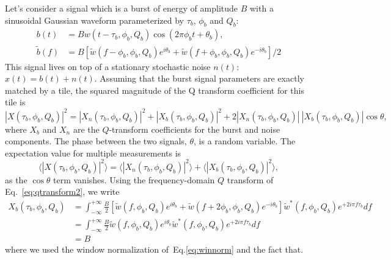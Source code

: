 Let's consider a signal which is a burst of energy of amplitude $B$ with a sinusoidal Gaussian waveform parameterized by $\tau_b$, $\phi_b$ and $Q_b$:
\begin{align}
  b(t) &= Bw(t-\tau_b, \phi_b, Q_b)\cos(2\pi\phi_b t + \theta_b),\\
  \tilde{b}(f) &= B\left[ \tilde{w}(f-\phi_b,\phi_b,Q_b)e^{i\theta_b}+\tilde{w}(f+\phi_b,\phi_b,Q_b)e^{-i\theta_b}\right]/2
\end{align}
This signal lives on top of a stationary stochastic noise $n(t)$: $x(t) = b(t) + n(t)$. Assuming that the burst signal parameters are exactly matched by a tile, the squared magnitude of the Q transform coefficient for this tile is
\begin{equation}
  |X(\tau_b, \phi_b, Q_b)|^2 = |X_n(\tau_b, \phi_b, Q_b)|^2 + |X_b(\tau_b, \phi_b, Q_b)|^2 + 2|X_n(\tau_b, \phi_b, Q_b)|\ |X_b(\tau_b, \phi_b, Q_b)|\cos{\theta},
\end{equation}
where $X_b$ and $X_n$ are the $Q$-transform coefficients for the burst and noise components. The phase between the two signals, $\theta$, is a random variable. The expectation value for multiple measurements is
\begin{equation}
  \langle |X(\tau_b, \phi_b, Q_b)|^2 \rangle= \langle |X_n(\tau_b, \phi_b, Q_b)|^2 \rangle + \langle |X_b(\tau_b, \phi_b, Q_b)|^2 \rangle,
\end{equation}
as the $\cos{\theta}$ term vanishes.  Using the frequency-domain $Q$ transform of Eq.~\ref{eq:qtransform2}, we write
\begin{align}
  X_b(\tau_b, \phi_b, Q_b) &= \int_{-\infty}^{+\infty}{ \frac{B}{2}\left[ \tilde{w}(f,\phi_b,Q_b)e^{i\theta_b}+\tilde{w}(f+2\phi_b,\phi_b,Q_b)e^{-i\theta_b}\right] \tilde{w}^{*}(f,\phi_b,Q_b) e^{+2i\pi f \tau_b}df} \\
  &= \int_{-\infty}^{+\infty}{ \frac{B}{2} \tilde{w}(f,\phi_b,Q_b)e^{i\theta_b} \tilde{w}^{*}(f,\phi_b,Q_b) e^{+2i\pi f \tau_b}df} \\
  &= B
\end{align}
where we used the window normalization of~Eq.\ref{eq:winnorm} and the fact that.
